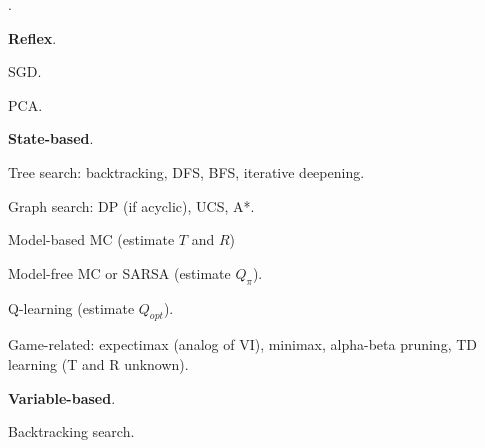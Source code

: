 \documentclass[11pt]{article}
\newcommand\myspace[1][]{\vspace{#1\bigskipamount}\Needspace{10\baselineskip}}
\newcommand\p{\Needspace{10\baselineskip} \noindent}
\newcommand\bluesec[1]{\myspace \p \blue{#1}}
\begin{document}
\bluesec{Algorithms}. 
\begin{compactitem}
	\item \textbf{Reflex}. 
	\begin{compactitem}
		\item SGD.
		\item PCA. 
	\end{compactitem}

	\item \textbf{State-based}. 
	\begin{compactitem}
		\item Tree search: backtracking, DFS, BFS, iterative deepening. 
		\item Graph search: DP (if acyclic), UCS, A*. 
		\item {}
		\item Model-based MC (estimate $T$ and $R$)
		\item Model-free MC  or SARSA (estimate $Q_{\pi}$).
		\item Q-learning (estimate $Q_{opt}$).  
		\item Game-related: expectimax (analog of VI), minimax, alpha-beta pruning, TD learning (T and R unknown). 
	\end{compactitem}

	\item \textbf{Variable-based}. 
	\begin{compactitem}
		\item Backtracking search.
	\end{compactitem}
\end{compactitem}






\label{Learning from Mistakes}



\end{document}
